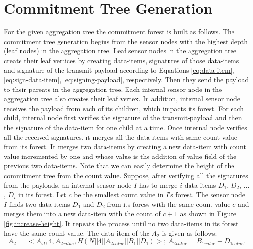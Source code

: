\section{Commitment Tree Generation}
	For the given aggregation tree the commitment forest is built as follows.
	The commitment tree generation begins from the sensor nodes with the highest depth (leaf nodes) in the aggregation tree.
	Leaf sensor nodes in the aggregation tree create their leaf vertices by creating data-items, signatures of those data-items and signature of the transmit-payload according to Equations \ref{eq:data-item}, \ref{eq:sign-data-item}, \ref{eq:signing-payload}, respectively.
	Then they send the payload to their parents in the aggregation tree.	
	Each internal sensor node in the aggregation tree also creates their leaf vertex.
	In addition, internal sensor node receives the payload from each of its children, which impacts its forest.
	For each child, internal node first verifies the signature of the transmit-payload and then the signature of the data-item for one child at a time.
	Once internal node verifies all the received signatures, it merges all the data-items with same count value from its forest.
	It merges two data-items by creating a new data-item with count value incremented by one and whose value is the addition of value field of the previous two data-items. 
	Note that we can easily determine the height of the commitment tree from the count value.
	Suppose, after verifying all the signatures from the payloads, an internal sensor node $I$ has to merge $i$ data-items $D_{1}$, $D_{2}$, $\dotsc$, $D_{i}$ in its forest.
	Let $c$ be the smallest count value in $I$'s forest.
	The sensor node $I$ finds two data-items $D_{1}$ and $D_{2}$ from its forest with the same count value $c$ and merges them into a new data-item with the count of $c+1$ as shown in Figure \ref{fig:increase-height}.
	It repeats the process until no two data-items in its forest have the same count value.	
	The data-item of the $A_{2}$ is given as follows:
	\begin{equation*}
		A_{2} =\ <A_{id}, 4, A_{2value},H(N||4||A_{2value}||B_{1}||D_{1})>;\ A_{2value} = B_{1value} + D_{1value}. 
	\end{equation*}
	
